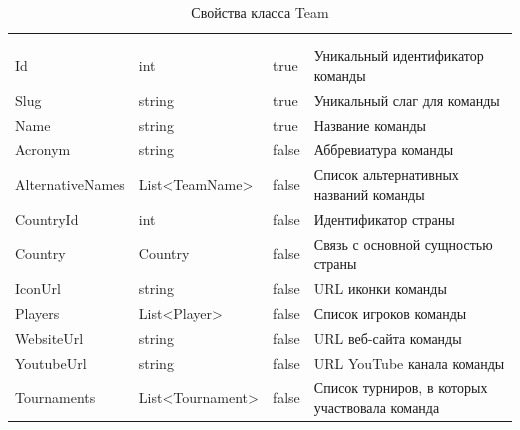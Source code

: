 \begin{xltabular}{\textwidth}{|X|X|X|X|}
	\caption{Свойства класса Team}\label{table:Team}\\ \hline
	 &  &  &  \\ \hline
	 &  &  &  \\ \hline
	\endfirsthead
	 \hline
	 &  &  &  \\ \hline
	\endhead
	Id & int & true & Уникальный идентификатор команды \\ \hline
	Slug & string & true & Уникальный слаг для команды \\ \hline
	Name & string & true & Название команды \\ \hline
	Acronym & string & false & Аббревиатура команды \\ \hline
	AlternativeNames & List<TeamName> & false & Список альтернативных названий команды \\ \hline
	CountryId & int & false & Идентификатор страны \\ \hline
	Country & Country & false & Связь с основной сущностью страны \\ \hline
	IconUrl & string & false & URL иконки команды \\ \hline
	Players & List<Player> & false & Список игроков команды \\ \hline
	WebsiteUrl & string & false & URL веб-сайта команды \\ \hline
	YoutubeUrl & string & false & URL YouTube канала команды \\ \hline
	Tournaments & List<Tournament> & false & Список турниров, в которых участвовала команда \\ \hline
\end{xltabular}

